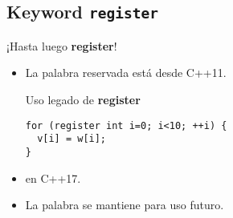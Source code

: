 \subsection{Keyword \bf{\texttt{register}}}

\begin{frame}[t,fragile]{¡Hasta luego \textbf{register}!}
\begin{itemize}
  \item La palabra reservada  está 
        desde C++11.
\begin{block}{Uso legado de \textbf{register}}
\begin{lstlisting}
for (register int i=0; i<10; ++i) {
  v[i] = w[i];
}
\end{lstlisting}
\end{block}
  \vfill
  \item {} en C++17.
  \vfill
  \item La palabra  se mantiene 
        para uso futuro.
\end{itemize}
\end{frame}

